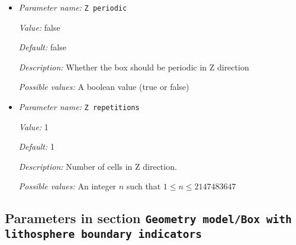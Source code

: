 \begin{itemize}
{\it Value:} 1


{\it Default:} 1


{\it Description:} Extent of the box in z-direction. This value is ignored if the simulation is in 2d. Units: m.


{\it Possible values:} A floating point number $v$ such that $0 \leq v \leq \text{MAX\_DOUBLE}$
\item {\it Parameter name:} {\tt Z periodic}
\label{parameters:Geometry model/Box/Z periodic}


{\it Value:} false


{\it Default:} false


{\it Description:} Whether the box should be periodic in Z direction


{\it Possible values:} A boolean value (true or false)
\item {\it Parameter name:} {\tt Z repetitions}
\label{parameters:Geometry model/Box/Z repetitions}


{\it Value:} 1


{\it Default:} 1


{\it Description:} Number of cells in Z direction.


{\it Possible values:} An integer $n$ such that $1\leq n \leq 2147483647$
\end{itemize}

\subsection{Parameters in section \tt Geometry model/Box with lithosphere boundary indicators}
\label{parameters:Geometry_20model/Box_20with_20lithosphere_20boundary_20indicators}

